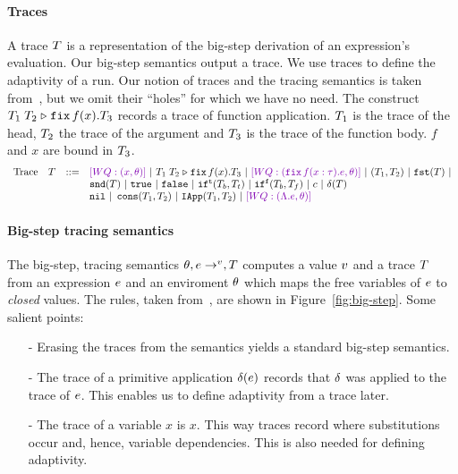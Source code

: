 \documentclass[a4paper,11pt]{article}
\theoremstyle{definition}
\begin{document}
\paragraph{Traces}
A trace $T$ is a representation of the big-step derivation of an
expression's evaluation. Our big-step semantics output a trace. We use
traces to define the adaptivity of a run. Our notion of traces and the
tracing semantics is taken from~\cite[Section 4]{perera:dep}, but we
omit their ``holes'' for which we have no need. The construct
$T_1 \; T_2 \mathrel{\triangleright} {\mathop{\mathtt{fix}} f(x).T_3}$ records a trace of function
application. $T_1$ is the trace of the head, $T_2$ the trace of
the argument and $T_3$ is the trace of the function body. $f$ and
$x$ are bound in $T_3$.
%
\[\begin{array}{llll}
\mbox{Trace} & \tr & ::= & \wq{(x, \env)} ~|~ \trapp{\tr_1}{\tr_2}{f}{x}{\tr_3} ~|~
\wq{ (\trfix f(x:\type).e, \env) } ~|~ (\tr_1, \tr_2) ~|~ \trprojl(\tr) ~|\\ 
%
& & & \trprojr(\tr) ~|~ \trtrue ~|~ \trfalse ~|~ \trift(\tr_b, \tr_t)
~|~ \triff(\tr_b, \tr_f) ~|~ \trconst ~|~ \trop(\tr) \\
%
& & & \trnil ~|~ \trcons (\tr_1, \tr_2) ~|~ \triapp{\tr_1}{\tr_2} ~|~
      \wq {(\eilam \expr, \env)}
\end{array}\]


\paragraph{Big-step tracing semantics}
The big-step, tracing semantics $\theta, e \mathrel{\to^{v}}, T$
computes a value $v$ and a trace $T$ from an expression $e$
and an enviroment $\theta$ which maps the free variables of $e$ to
\emph{closed} values. The rules, taken from~\cite{perera:dep}, are
shown in Figure~\ref{fig:big-step}. Some salient points:
\begin{itemize}
\item[-] Erasing the traces from the semantics yields a standard
  big-step semantics.
\item[-] The trace of a primitive application $\delta(e)$
  records that $\delta$ was applied to the trace of
  $e$. This enables us to define adaptivity from a trace later.
\item[-] The trace of a variable $x$ is $x$. This way traces record
  where substitutions occur and, hence, variable dependencies. This is
  also needed for defining adaptivity.
\end{itemize}
\end{document}
